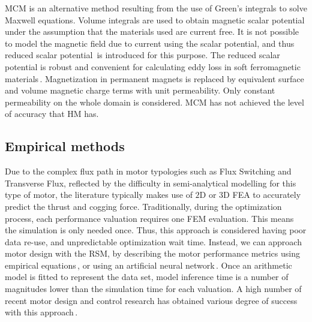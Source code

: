         
        \ac{MCM} is an alternative method resulting from the use of Green’s integrals to solve Maxwell equations. Volume integrals are used to obtain magnetic scalar potential under the assumption that the materials used are current free. It is not possible to model the magnetic field due to current using the scalar potential, and thus reduced scalar potential\,\cite{Gong2009AnalysisMethod} is introduced for this purpose. The reduced scalar potential is robust and convenient for calculating eddy loss in soft ferromagnetic materials\,\cite{Xu2004TotalCalculation,Bowler1987EddyFunctions,Rubinacci2004AComputation}. Magnetization in permanent magnets is replaced by equivalent surface and volume magnetic charge terms with unit permeability. Only constant permeability on the whole domain is considered. \acs{MCM} has not achieved the level of accuracy that \acs{HM} has.
        
    
    \subsection{Empirical methods}                  \label{Chapter:background/modelling techniques for designing motors/empirical methods}


        Due to the complex flux path in motor typologies such as Flux Switching and Transverse Flux, reflected by the difficulty in semi-analytical modelling for this type of motor, the literature typically makes use of $\mathrm{2D}$ or $\mathrm{3D}$ \acs{FEA} to accurately predict the thrust and cogging force. Traditionally, during the optimization process, each performance valuation requires one FEM evaluation. This means the simulation is only needed once. Thus, this approach is considered having poor data re-use, and unpredictable optimization wait time. Instead, we can approach motor design with the \ac{RSM}, by describing the motor performance metrics using empirical equations\,\cite{Hong2008,Lei2013}, or using an artificial neural network\,\cite{Hadjout2006,Ashabani2010OptimumApproach}. Once an arithmetic model is fitted to represent the data set, model inference time is a number of magnitudes lower than the simulation time for each valuation. A high number of recent motor design and control research has obtained various degree of success with this approach\,\cite{Hwang2007RotorMethod,Lee2012OptimumMethod,Kim2006OptimalMethodology,Jung2015AdaptiveDrives,Hong2018DesignApplications}. 
        
